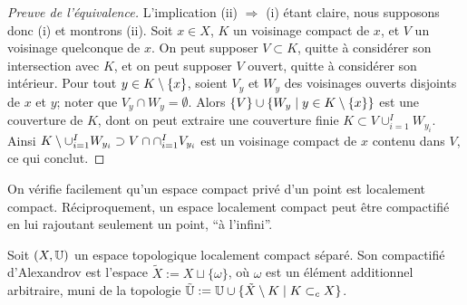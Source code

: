 \begin{proof}[Preuve de l'équivalence]
	L'implication (ii) $\Rightarrow$ (i) étant claire, nous supposons donc (i) et montrons (ii).
	Soit $x \in X$, $K$ un voisinage compact de $x$, et $V$ un voisinage quelconque de $x$. On peut supposer $V\subset K$, quitte à considérer son intersection avec $K$, et on peut supposer $V$ ouvert, quitte à considérer son intérieur. 
	Pour tout $y \in K \setminus \{x\}$, soient $V_y$ et $W_y$ des voisinages ouverts disjoints de $x$ et $y$; noter que $V_y \cap W_y = \emptyset$. 
	Alors $\{V\} \cup \{W_y \mid y \in K \setminus \{x\} \}$ est une couverture de $K$, dont on peut extraire une couverture finie $K \subset V \cup_{i=1}^I W_{y_i}$. 
	Ainsi $K \setminus \cup_{i=1}^I W_{y_i} \supset V \cap \cap_{i=1}^I V_{y_i}$ est un voisinage compact de $x$ contenu dans $V$, ce qui conclut. 
\end{proof}



On vérifie facilement qu'un espace compact privé d'un point est localement compact. Récipro\-quement, 
un espace localement compact peut être compactifié en lui rajoutant seulement un point, ``à l'infini''. 


\begin{definition}
\label{def:compactAlex}
%
	Soit $(X, \mathbb{U})$ un espace topologique localement compact séparé. 
	Son compactifié d'Alexandrov est l'espace $\tilde X := X \sqcup \{\omega\}$, où $\omega$ est un élément additionnel arbitraire, muni de la topologie $\tilde {\mathbb{U}} := \mathbb{U} \cup \{\tilde X \setminus K \mid K \subset_c X\}$. 
\end{definition}


